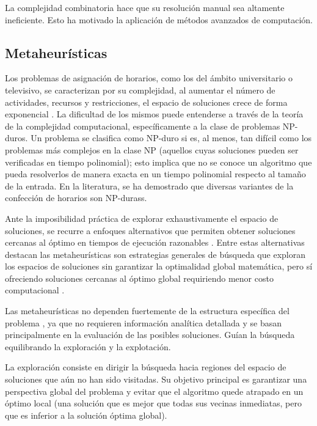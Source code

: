 \documentclass{article}
\begin{document}
\vspace{0.3cm}
La complejidad combinatoria hace que su resolución manual sea altamente ineficiente. Esto ha motivado la aplicación de métodos avanzados de computación.

\subsection{Metaheurísticas}
\label{sec:meta}

Los problemas de asignación de horarios, como los del ámbito universitario o televisivo, se caracterizan por su complejidad, al aumentar el número de actividades, recursos y restricciones, el espacio de soluciones crece de forma exponencial \cite{talbi2009}. La dificultad de los mismos puede entenderse a través de la teoría de la complejidad computacional, específicamente a la clase de problemas NP-duros.  Un problema se clasifica como NP-duro si es, al menos, tan difícil como los problemas más complejos en la clase NP (aquellos cuyas soluciones pueden ser verificadas en tiempo polinomial); esto implica que no se conoce un algoritmo que pueda resolverlos de manera exacta en un tiempo polinomial respecto al tamaño de la entrada. En la literatura, se ha demostrado que diversas variantes de la confección de horarios son NP-durass. 

Ante la imposibilidad práctica de explorar exhaustivamente el espacio de soluciones, se recurre a enfoques alternativos que permiten obtener soluciones cercanas al óptimo en tiempos de ejecución razonables \cite{talbi2009}. Entre estas alternativas destacan las metaheurísticas son estrategias generales de búsqueda que exploran los espacios de soluciones sin garantizar la optimalidad global matemática, pero sí ofreciendo soluciones cercanas al óptimo global requiriendo menor costo computacional \cite{blum2003}.

Las metaheurísticas no dependen fuertemente de la estructura específica del problema \cite{blum2003}, ya que no requieren información analítica detallada y se basan principalmente en la evaluación de las posibles soluciones. Guían la búsqueda equilibrando la exploración y la explotación.

La exploración consiste en dirigir la búsqueda hacia regiones del espacio de soluciones que aún no han sido visitadas. Su objetivo principal es garantizar una perspectiva global del problema y evitar que el algoritmo quede atrapado en un óptimo local (una solución que es mejor que todas sus vecinas inmediatas, pero que es inferior a la solución óptima global).
\end{document}

